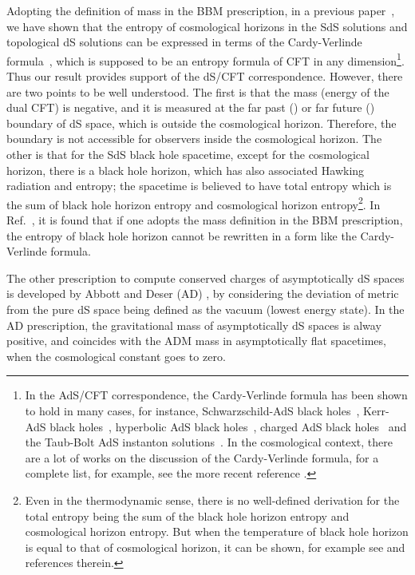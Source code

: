 \documentclass[a4paper,12pt]{article}
\begin{document}
Adopting the definition of mass in the BBM prescription, in a previous paper~\cite{Cai1},
we have shown that the entropy of cosmological horizons in the SdS  solutions
and topological dS solutions can be expressed in terms of the Cardy-Verlinde 
formula~\cite{Verl}, which is supposed to be an entropy formula of CFT in any 
dimension\footnote{In the AdS/CFT correspondence, the Cardy-Verlinde formula has
been shown to hold in many cases, for instance, Schwarzschild-AdS black holes~\cite{Verl},
Kerr-AdS black holes~\cite{Klem2}, hyperbolic AdS black holes~\cite{Cai2}, charged AdS
black holes~\cite{Cai2} and the Taub-Bolt AdS instanton solutions~\cite{Birm}. In the
cosmological context, there are a lot of works on the discussion of the Cardy-Verlinde
formula, for a complete list, for example, see the more recent reference \cite{Myung1}.}.
Thus our result provides support of the dS/CFT correspondence. However, there are two
points to be well understood. The first is that the mass (energy of the dual CFT) is 
negative, and it is measured at the far past (\coordHE{}) or far future (\coordHE{})
 boundary of dS space, which is outside the cosmological horizon. Therefore, the boundary is
not accessible for observers inside the cosmological horizon. The other is that for 
the SdS black hole spacetime, except for the cosmological horizon,
there is a black hole horizon, which has also associated  Hawking radiation and 
entropy; the spacetime is believed to have total entropy which is the sum of black hole horizon
entropy and cosmological horizon entropy\footnote{Even in the thermodynamic sense,
there is no well-defined derivation for the total entropy being the sum of the black hole
horizon entropy and cosmological horizon entropy. But when the temperature of black  hole 
horizon is equal to that of cosmological horizon, it can be shown,
for example see \cite{CJS} and references therein.}. In Ref.~\cite{Cai1}, it is found that
if one  adopts the mass definition in the BBM prescription, the entropy of black hole horizon
cannot be rewritten in a form like the Cardy-Verlinde formula.  
 

The other prescription to compute conserved charges of asymptotically dS spaces is developed
by Abbott and Deser (AD) \cite{AD}, by considering the deviation of metric from the pure
dS space being defined as the vacuum (lowest energy state). In the AD prescription,
 the gravitational
mass of asymptotically dS spaces is alway positive, and coincides with the ADM mass in 
asymptotically flat spacetimes, when the cosmological constant goes to zero.  
\end{document}
